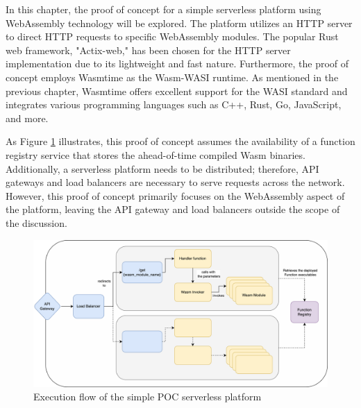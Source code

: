 In this chapter, the proof of concept for a simple serverless platform using WebAssembly technology will be explored. The platform utilizes an HTTP server to direct HTTP requests to specific WebAssembly modules. The popular Rust web framework, "Actix-web," has been chosen for the HTTP server implementation due to its lightweight and fast nature. Furthermore, the proof of concept employs Wasmtime as the Wasm-WASI runtime. As mentioned in the previous chapter, Wasmtime offers excellent support for the WASI standard and integrates various programming languages such as C++, Rust, Go, JavaScript, and more.

As Figure \ref{fig:poc} illustrates, this proof of concept assumes the availability of a function registry service that stores the ahead-of-time compiled Wasm binaries. Additionally, a serverless platform needs to be distributed; therefore, API gateways and load balancers are necessary to serve requests across the network. However, this proof of concept primarily focuses on the WebAssembly aspect of the platform, leaving the API gateway and load balancers outside the scope of the discussion.

\begin{figure}[H]
	\centering
		\includegraphics[width=1\linewidth]{images/poc/poc.pdf}
	\caption{Execution flow of the simple POC serverless platform}
	\label{fig:poc}
\end{figure}



